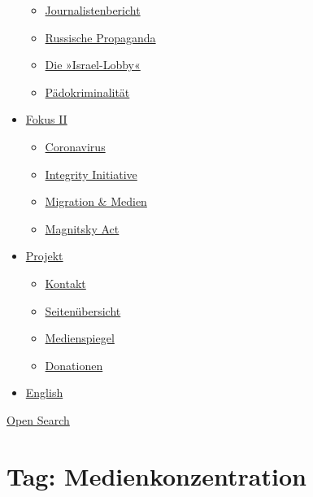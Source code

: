 \begin{itemize}
  \begin{itemize}
  \tightlist
  \item
    \href{https://swprs.org/bericht-eines-journalisten/}{Journalistenbericht}
  \item
    \href{https://swprs.org/russische-propaganda/}{Russische Propaganda}
  \item
    \href{https://swprs.org/die-israel-lobby-fakten-und-mythen/}{Die
    »Israel-Lobby«}
  \item
    \href{https://swprs.org/geopolitik-und-paedokriminalitaet/}{Pädokriminalität}
  \end{itemize}
\item
  \href{https://swprs.org/migration-und-medien/}{Fokus II}

  \begin{itemize}
  \tightlist
  \item
    \href{https://swprs.org/covid-19-hinweis-ii/}{Coronavirus}
  \item
    \href{https://swprs.org/die-integrity-initiative/}{Integrity
    Initiative}
  \item
    \href{https://swprs.org/migration-und-medien/}{Migration \& Medien}
  \item
    \href{https://swprs.org/der-fall-magnitsky/}{Magnitsky Act}
  \end{itemize}
\item
  \href{https://swprs.org/kontakt/}{Projekt}

  \begin{itemize}
  \tightlist
  \item
    \href{https://swprs.org/kontakt/}{Kontakt}
  \item
    \href{https://swprs.org/uebersicht/}{Seitenübersicht}
  \item
    \href{https://swprs.org/medienspiegel/}{Medienspiegel}
  \item
    \href{https://swprs.org/donationen/}{Donationen}
  \end{itemize}
\item
  \href{https://swprs.org/contact/}{English}
\end{itemize}

\protect\hyperlink{}{Open Search}

\hypertarget{tag-medienkonzentration}{%
\section{Tag: Medienkonzentration}\label{tag-medienkonzentration}}

